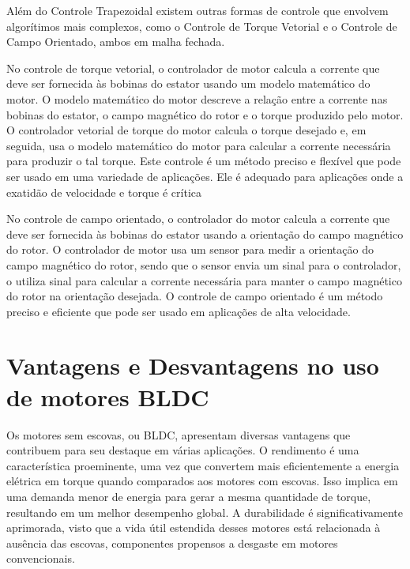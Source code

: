\documentclass[12pt, a4paper, openright, oneside, brazilian]{abntex2}
\begin{document}
 Além do Controle Trapezoidal existem outras formas de controle que envolvem algorítimos mais complexos, como o Controle de Torque Vetorial e o Controle de Campo Orientado, ambos em malha fechada. 

 No controle de torque vetorial, o controlador de motor calcula a corrente que deve ser fornecida às bobinas do estator usando um modelo matemático do motor. O modelo matemático do motor descreve a relação entre a corrente nas bobinas do estator, o campo magnético do rotor e o torque produzido pelo motor. O controlador vetorial de torque do motor calcula o torque desejado e, em seguida, usa o modelo matemático do motor para calcular a corrente necessária para produzir o tal torque. Este controle é um método preciso e flexível que pode ser usado em uma variedade de aplicações. Ele é adequado para aplicações onde a exatidão de velocidade e torque é crítica 

 No controle de campo orientado, o controlador do motor calcula a corrente que deve ser fornecida às bobinas do estator usando a orientação do campo magnético do rotor. O controlador de motor usa um sensor para medir a orientação do campo magnético do rotor, sendo que o sensor envia um sinal para o controlador, o utiliza sinal para calcular a corrente necessária para manter o campo magnético do rotor na orientação desejada. O controle de campo orientado é um método preciso e eficiente que pode ser usado em aplicações de alta velocidade. 

 \pagebreak 

 \section{Vantagens e Desvantagens no uso de motores BLDC} 
 Os motores sem escovas, ou BLDC, apresentam diversas vantagens que contribuem para seu destaque em várias aplicações. O rendimento é uma característica proeminente, uma vez que convertem mais eficientemente a energia elétrica em torque quando comparados aos motores com escovas. Isso implica em uma demanda menor de energia para gerar a mesma quantidade de torque, resultando em um melhor desempenho global. A durabilidade é significativamente aprimorada, visto que a vida útil estendida desses motores está relacionada à ausência das escovas, componentes propensos a desgaste em motores convencionais. 
\end{document}
